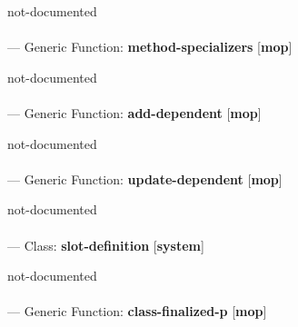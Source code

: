 \begin{adjustwidth}{5em}{5em}
not-documented
\end{adjustwidth}

\paragraph{}
\label{MOP:METHOD-SPECIALIZERS}
--- Generic Function: \textbf{method-specializers} [\textbf{mop}] \textit{}

\begin{adjustwidth}{5em}{5em}
not-documented
\end{adjustwidth}

\paragraph{}
\label{MOP:ADD-DEPENDENT}
--- Generic Function: \textbf{add-dependent} [\textbf{mop}] \textit{}

\begin{adjustwidth}{5em}{5em}
not-documented
\end{adjustwidth}

\paragraph{}
\label{MOP:UPDATE-DEPENDENT}
--- Generic Function: \textbf{update-dependent} [\textbf{mop}] \textit{}

\begin{adjustwidth}{5em}{5em}
not-documented
\end{adjustwidth}

\paragraph{}
\label{SYSTEM:SLOT-DEFINITION}
--- Class: \textbf{slot-definition} [\textbf{system}] \textit{}

\begin{adjustwidth}{5em}{5em}
not-documented
\end{adjustwidth}

\paragraph{}
\label{MOP:CLASS-FINALIZED-P}
--- Generic Function: \textbf{class-finalized-p} [\textbf{mop}] \textit{}

